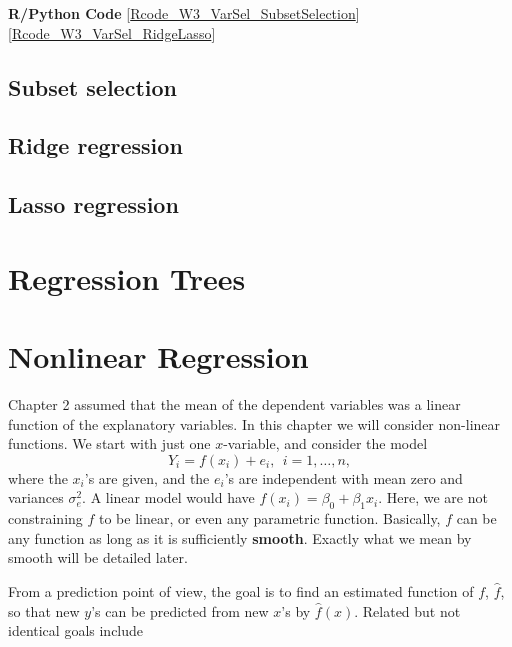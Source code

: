 \documentclass[
]{book}
\begin{document}
\textbf{R/Python Code}
{[}\href{https://liangfgithub.github.io/Rcode_W3_VarSel_SubsetSelection.html}{Rcode\_W3\_VarSel\_SubsetSelection}{]}
{[}\href{https://liangfgithub.github.io/Rcode_W3_VarSel_RidgeLasso.html}{Rcode\_W3\_VarSel\_RidgeLasso}{]}

\hypertarget{subset-selection}{%
\section{Subset selection}\label{subset-selection}}

\hypertarget{ridge-regression}{%
\section{Ridge regression}\label{ridge-regression}}

\hypertarget{lasso-regression}{%
\section{Lasso regression}\label{lasso-regression}}

\hypertarget{regression-trees}{%
\chapter{Regression Trees}\label{regression-trees}}

\hypertarget{nonlinear-regression}{%
\chapter{Nonlinear Regression}\label{nonlinear-regression}}

Chapter 2 assumed that the mean of the dependent variables was a linear function of the explanatory variables. In this chapter we will consider non-linear functions. We start with just one \(x\)-variable, and consider the model
\begin{equation}
Y_i = f(x_i)+e_i,~~i=1,\ldots,n,
\label{eq:smooth1}
\end{equation}
where the \(x_i\)'s are given, and the \(e_i\)'s are independent with mean zero and variances \(\sigma^2_e\). A linear model would have \(f(x_i)=\beta_0+\beta_1x_i\). Here, we are not constraining \(f\) to be linear, or even any parametric function. Basically, \(f\) can be any function as long as it is sufficiently \textbf{smooth}. Exactly what we mean by smooth will be detailed later.

From a prediction point of view, the goal is to find an estimated function of \(f\), \(\widehat f\), so that new \(y\)'s can be predicted from new \(x\)'s by \(\widehat f(x)\). Related but not identical goals include
\end{document}
